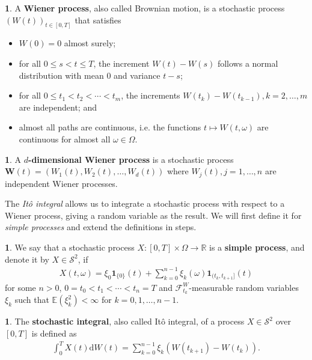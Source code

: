 \documentclass[english]{article}
\numberwithin{equation}{section}
\numberwithin{figure}{section}
\theoremstyle{bolddescit}
\theoremstyle{definition}
\newtheorem{definition}[theorem]{\protect\definitionname}
\theoremstyle{definition}
\theoremstyle{plain}
\theoremstyle{plain}
\theoremstyle{bolddesc}
\theoremstyle{plain}
\theoremstyle{remark}
\providecommand{\definitionname}{Definition}
\begin{document}
\begin{definition}
  A \textbf{Wiener process}, also called Brownian motion, is a stochastic process $(W(t))_{t \in [0,T]}$ that satisfies
  \begin{itemize}
    \item $W(0) = 0$ almost surely;
    \item for all $0 \le s < t \le T$, the increment $W(t) - W(s)$ follows a normal distribution with mean 0 and variance $t - s$;
    \item for all $0 \le t_1 < t_2 < \cdots < t_m$, the increments $W(t_k) - W(t_{k-1}), k=2,\ldots,m$ are independent; and
    \item almost all paths are continuous, i.e. the functions $t \mapsto W(t,\omega)$ are continuous for almost all $\omega \in \Omega$.
  \end{itemize}
\end{definition}

\begin{definition}
  A \textbf{$d$-dimensional Wiener process} is a stochastic process $\mathbf{W}(t) = (W_1(t), W_2(t), \ldots, W_d(t))$ where $W_j(t), j=1,\ldots,n$ are independent Wiener processes.
\end{definition}

The \textit{It\^o integral} allows us to integrate a stochastic process with respect to a Wiener process, giving a random variable as the result. We will first define it for \textit{simple processes} and extend the definitions in steps.

\begin{definition}
  We say that a stochastic process $X : [0,T] \times \Omega \to \mathbb{R}$ is a \textbf{simple process}, and denote it by $X \in \mathcal{S}^2$, if
  \begin{align*}
    X(t,\omega) = \xi_0 \mathbf{1}_{\{0\}}(t) + \sum_{k=0}^{n-1} \xi_k(\omega) \mathbf{1}_{(t_k,t_{k+1}]}(t)
  \end{align*}
  for some $n > 0$, $0 = t_0 < t_1 < \cdots < t_n = T$ and $\mathcal{F}^W_{t_k}$-measurable random variables $\xi_k$ such that $\mathbb{E}(\xi_k^2) < \infty$ for $k = 0,1,\ldots,n-1$.
\end{definition}

\begin{definition}
  The \textbf{stochastic integral}, also called It\^o integral, of a process $X \in \mathcal{S}^2$ over $[0,T]$ is defined as
  \begin{align*}
    \int_0^T X(t) \mathrm{d}W(t) = \sum_{k=0}^{n-1} \xi_k (W(t_{k+1}) - W(t_k)).
  \end{align*}
\end{definition}
\end{document}
